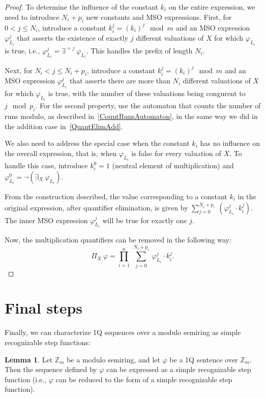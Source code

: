 \documentclass[en]{pracamgr}
\theoremstyle{definition}
\newtheorem{lemma}[theorem]{Lemma}
\begin{document}
\begin{proof}
    To determine the influence of the constant $k_i$ on the entire expression, we need to introduce $N_i + p_i$ new constants and MSO expressions. First, for $0 < j \leq N_i$, introduce a constant $k_i^j = (k_i)^j \mod m$ and an MSO expression $\varphi_{L_i}^j$ that asserts the existence of exactly $j$ different valuations of $X$ for which $\varphi_{L_i}$ is true, i.e., $\varphi_{L_i}^j = \exists^{=j} \ \varphi_{L_i}$. This handles the prefix of length $N_i$.
    
    Next, for $N_i < j \leq N_i + p_i$, introduce a constant $k_i^j = (k_i)^j \mod m$ and an MSO expression $\varphi_{L_i}^j$ that asserts there are more than $N_i$ different valuations of $X$ for which $\varphi_{L_i}$ is true, with the number of these valuations being congurent to $j \mod p_i$. For the second property, use the automaton that counts the number of runs modulo, as described in~\cref{CountRunsAutomaton}, in the same way we did in the addition case in~\cref{QuantElimAdd}.

    We also need to address the special case when the constant $k_i$ has no influence on the overall expression, that is, when $\varphi_{L_i}$ is false for every valuation of $X$. To handle this case, introduce $k_i^0 = 1$ (neutral element of multiplication) and $\varphi_{L_i}^0 = \neg(\exists_X \ \varphi_{L_i})$.

    From the construction described, the value corresponding to a constant $k_i$ in the original expression, after quantifier elimination, is given by $\sum_{j = 0}^{N_i + p_i} \ (\varphi_{L_i}^j \cdot k_i^j)$. The inner MSO expression $\varphi_{L_i}^j$ will be true for exactly one $j$.
    
    Now, the multiplication quantifiers can be removed in the following way:
    $$\Pi_X \ \varphi = \prod_{i = 1}^n \ \sum_{j = 0}^{N_i + p_i} \ \varphi_{L_i}^j \cdot k_i^j.$$
\end{proof}

\section{Final steps}
Finally, we can characterize 1Q sequences over a modulo semiring as simple recognizable step functions:

\begin{lemma}
    \label{OverModAreSimpleRec}
    Let $\mathbb{Z}_m$ be a modulo semiring, and let $\varphi$ be a 1Q sentence over $\mathbb{Z}_m$. Then the sequence defined by $\varphi$ can be expressed as a simple recognizable step function (i.e., $\varphi$ can be reduced to the form of a simple recognizable step function). 
\end{lemma}
\end{document}
